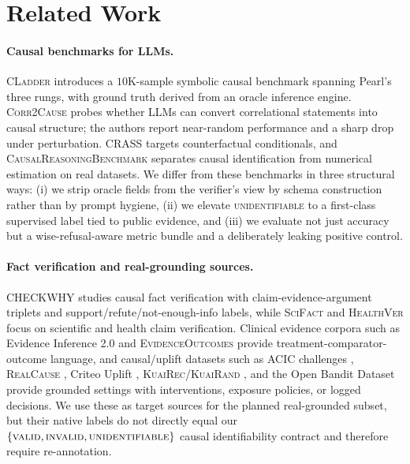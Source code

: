 \documentclass{article}
\theoremstyle{plain}
\theoremstyle{definition}
\theoremstyle{remark}
\begin{document}
\section{Related Work}
\label{sec:related}

\paragraph{Causal benchmarks for LLMs.}
\textsc{CLadder} \cite{jin2023cladder} introduces a $10$K-sample symbolic
causal benchmark spanning Pearl's three rungs, with ground truth derived from
an oracle inference engine. \textsc{Corr2Cause} \cite{jin2024corr2cause} probes
whether LLMs can convert correlational statements into causal structure; the
authors report near-random performance and a sharp drop under perturbation.
\textsc{CRASS} \cite{frohberg2022crass} targets counterfactual conditionals,
and \textsc{CausalReasoningBenchmark}
\cite{sawarni2026causalreasoningbenchmark} separates causal identification
from numerical estimation on real datasets. We differ from these benchmarks in
three structural ways: (i) we strip oracle fields from the verifier's view by
schema construction rather than by prompt hygiene, (ii) we elevate
\textsc{unidentifiable} to a first-class supervised label tied to public
evidence, and (iii) we evaluate not just accuracy but a wise-refusal-aware
metric bundle and a deliberately leaking positive control.

\paragraph{Fact verification and real-grounding sources.}
\textsc{CHECKWHY} \cite{si2024checkwhy} studies causal fact verification with
claim-evidence-argument triplets and support/refute/not-enough-info labels,
while \textsc{SciFact} \cite{wadden2020scifact} and \textsc{HealthVer}
\cite{sarrouti2021healthver} focus on scientific and health claim
verification. Clinical evidence corpora such as Evidence Inference 2.0
\cite{deyoung2020evidenceinference} and \textsc{EvidenceOutcomes}
\cite{zhou2025evidenceoutcomes} provide treatment-comparator-outcome language,
and causal/uplift datasets such as ACIC challenges \cite{acic2019},
\textsc{RealCause} \cite{neal2021realcause}, Criteo Uplift \cite{criteo2014uplift},
\textsc{KuaiRec}/\textsc{KuaiRand} \cite{gao2022kuairec,gao2022kuairand},
and the Open Bandit Dataset \cite{saito2021openbandit} provide grounded
settings with interventions, exposure policies, or logged decisions. We use
these as target sources for the planned real-grounded subset, but their native
labels do not directly equal our
$\{\textsc{valid},\textsc{invalid},\textsc{unidentifiable}\}$ causal
identifiability contract and therefore require re-annotation.
\end{document}
